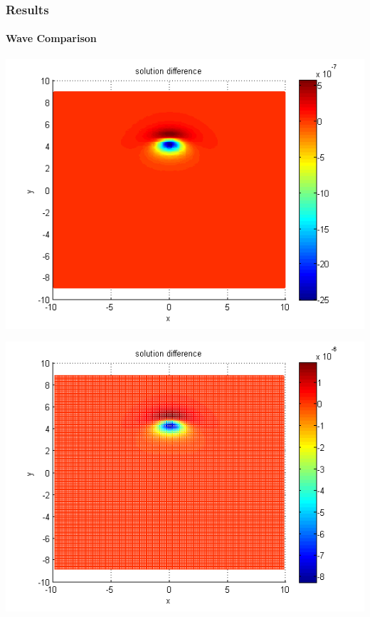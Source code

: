 \documentclass{beamer}
\begin{document}

\begin{frame}
\frametitle{Results}
\framesubtitle{Wave Comparison}
\begin{center}\vspace{0.4cm}
	\begin{minipage}[b]{0.32\linewidth}
		\includegraphics[width=\linewidth]{figures/compare_30_bt3_c045_h005.png}
	\end{minipage}	
	\begin{minipage}[b]{0.32\linewidth}
		\includegraphics[width=\linewidth]{figures/compare_30_bt3_c045_h010.png}
	\end{minipage}	

\end{center}
\end{frame}
\end{document}
